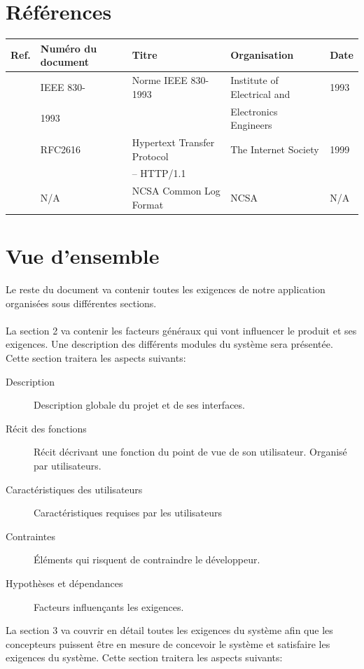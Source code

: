 \documentclass{scrreprt}
\begin{document}
\section{Références}

\begin{tabularx}{\textwidth}{|l|X|l|l|l|}
    \hline
    Ref. & Numéro du document & Titre & Organisation & Date\\
    \hline
    \cite{ieefr} & IEEE 830-& Norme IEEE 830-1993 & Institute of Electrical and & 1993\\
    & 1993& &  Electronics Engineers &\\
    \hline
    \cite{http} & RFC2616 & Hypertext Transfer Protocol & The Internet Society&	1999\\
    & & -- HTTP/1.1& &\\
    \hline
    \cite{NCSA} & N/A & NCSA Common Log Format & NCSA & N/A \\
    \hline
\end{tabularx}

\section{Vue d'ensemble}
Le  reste du document va contenir toutes les exigences de notre application organisées sous différentes sections.
\\
\\
La section 2 va contenir les facteurs généraux qui vont influencer le produit et ses exigences. Une description des différents modules du système sera présentée. Cette section traitera les aspects suivants:
\begin{description}
\item[Description] Description globale du projet et de ses interfaces.
\item[Récit des fonctions] Récit décrivant une fonction du point de vue de son utilisateur. Organisé par utilisateurs.
\item[Caractéristiques des utilisateurs] Caractéristiques requises par les utilisateurs
\item[Contraintes] Éléments qui risquent de contraindre le développeur.
\item[Hypothèses et dépendances] Facteurs influençants les exigences.
\end{description}

La section 3 va couvrir en détail toutes les exigences du système afin que les concepteurs puissent être en mesure de concevoir le système et satisfaire les exigences du système. Cette section traitera les aspects suivants:
\end{document}
